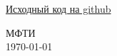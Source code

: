 \begin{titlepage}
	\vspace{0.5\baselineskip} %
	
	
	\href{https://github.com/wakeupnemo/konst}{Исходный код на github}
	
	\vfill %
	
	
	\vspace{0.3\baselineskip} %
	
	МФТИ  \\ \today %
	

	
	
\end{titlepage}